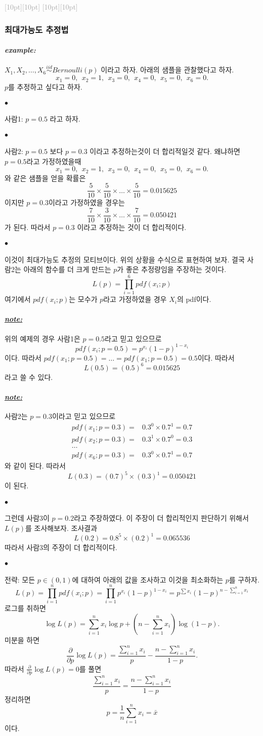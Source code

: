 \documentclass[12pt,oneside,english]{book}
\newcommand{\rdash}{\noindent \textcolor{darkgray}{ \raisebox{-1.9pt}[10pt][10pt]{\leafright} \hrulefill \raisebox{-1.9pt}[10pt][10pt]{\leafright \decofourleft \decothreeleft  \aldineright \decotwo \floweroneleft \decoone}}}
\def\ck{\paragraph{\Large$\bullet$}\Large}
\def\note{\paragraph{\Large\textit{\underline{note:}}}\Large}
\def\ex{\paragraph{\Large\textit{example:}}\Large}
\begin{document}
\rdash 

\subsubsection{최대가능도 추정법}

\ex $X_1,X_2,\dots,X_6 \overset{iid}{\sim} Bernoulli(p)$ 이라고 하자. 아래의 샘플을 관찰했다고 하자. 
\[
x_1=0,~~ x_2=1, ~~x_3=0, ~~ x_4=0, ~~ x_5=0, ~~ x_6=0.
\]
$p$를 추정하고 싶다고 하자. 

\ck 사람1: $p=0.5$ 라고 하자. 

\ck 사람2: $p=0.5$ 보다 $p=0.3$ 이라고 추정하는것이 더 합리적일것 같다. 왜냐하면 $p=0.5$라고 가정하였을때 
\[
x_1=0,~~ x_2=1, ~~x_3=0, ~~ x_4=0, ~~ x_5=0, ~~ x_6=0.
\]
와 같은 샘플을 얻을 확률은 
\[
\frac{5}{10}\times\frac{5}{10}\times \dots \times\frac{5}{10}=0.015625
\]
이지만 $p=0.3$이라고 가정하였을 경우는 
\[
\frac{7}{10}\times\frac{3}{10}\times \dots \times\frac{7}{10}=0.050421
\]
가 된다. 따라서 $p=0.3$ 이라고 추정하는 것이 더 합리적이다. 

\ck 이것이 최대가능도 추정의 모티브이다. 위의 상황을 수식으로 표현하여 보자. 결국 사람2는 아래의 함수를 더 크게 만드는 $p$가 좋은 추정량임을 주장하는 것이다. 
\[
L(p)=\prod_{i=1}^{6}pdf(x_i; p)
\]
여기에서 $pdf(x_i;p)$는 모수가 $p$라고 가정하였을 경우 $X_i$의 pdf이다. 

\note 위의 예제의 경우 사람1은 $p=0.5$라고 믿고 있으므로 
\[
pdf(x_i;p=0.5)=p^{x_i}(1-p)^{1-x_i}
\]
이다. 따라서 $pdf(x_1;p=0.5)=\dots=pdf(x_1;p=0.5)=0.5$이다. 따라서 
\[
L(0.5)=(0.5)^6=0.015625
\]
라고 쓸 수 있다. 

\note 사람2는 $p=0.3$이라고 믿고 있으므로 
\begin{align*}
pdf(x_1;p=0.3)=& 0.3^{0}\times 0.7^{1}=0.7 \\ 
pdf(x_2;p=0.3)=& 0.3^{1}\times 0.7^{0}=0.3 \\ 
\dots \\ 
pdf(x_6;p=0.3)=& 0.3^{0}\times 0.7^{1}=0.7
\end{align*}
와 같이 된다. 따라서 
\[
L(0.3)=(0.7)^5\times(0.3)^1=0.050421
\]
이 된다. 

\ck 그런데 사람3이 $p=0.2$라고 주장하였다. 이 주장이 더 합리적인지 판단하기 위해서 $L(p)$를 조사해보자. 조사결과 
\[
L(0.2)=0.8^5 \times(0.2)^1=0.065536
\]
따라서 사람3의 주장이 더 합리적이다. 

\ck 전략: 모든 $p \in (0,1)$에 대하여 아래의 값을 조사하고 이것을 최소화하는 $p$를 구하자. 
\[
L(p)=\prod_{i=1}^{n} pdf(x_i; p)=\prod_{i=1}^{n} p^{x_i}(1-p)^{1-x_i}=p^{\sum x_i}(1-p)^{n-\sum_{i=1}^nx_i}
\]
로그를 취하면 
\[
\log L(p) = \sum_{i=1}^{n}x_i \log p +\left(n-\sum_{i=1}^{n}x_i\right)\log(1-p).
\]
미분을 하면 
\[
\frac{\partial }{\partial p} \log L(p) = \frac{\sum_{i=1}^{n}x_i }{p} -\frac{n-\sum_{i=1}^{n}x_i}{1-p}.
\]
따라서 $\frac{\partial }{\partial p} \log L(p)=0$를 풀면 
\[
\frac{\sum_{i=1}^{n}x_i }{p} =\frac{n-\sum_{i=1}^{n}x_i}{1-p}
\]
정리하면 
\[
p=\frac{1}{n}\sum_{i=1}^{n}x_i=\bar{x}
\]
이다. 
\end{document}
